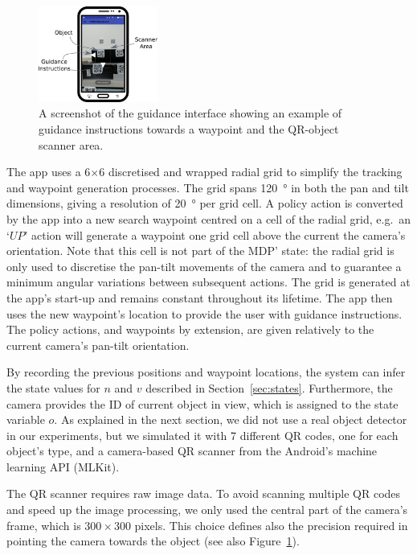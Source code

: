 \documentclass[a4paper, twoside]{article}
\begin{document}
\begin{figure}
  \centering
  \includegraphics[width=0.35\textwidth]{figures/system_screenshot2.png}
  \caption{A screenshot of the guidance interface showing an example of guidance instructions towards a waypoint and the QR-object scanner area.}\label{fig:system-screenshot}
\end{figure}

The app uses a 6$\times$6 discretised and wrapped radial grid to simplify the tracking and waypoint generation processes. The grid spans \SI{120}{\degree} in both the pan and tilt dimensions, giving a resolution of \SI{20}{\degree} per grid cell. A policy action is converted by the app into a new search waypoint centred on a cell of the radial grid, e.g.\ an `$UP$' action will generate a waypoint one grid cell above the current the camera's orientation. Note that this cell is not part of the MDP' state: the radial grid is only used to discretise the pan-tilt movements of the camera and to guarantee a minimum angular variations between subsequent actions. The grid is generated at the app's start-up and remains constant throughout its lifetime. The app then uses the new waypoint's location to provide the user with guidance instructions. The policy actions, and waypoints by extension, are given relatively to the current camera's pan-tilt orientation.  

By recording the previous positions and waypoint locations, the system can infer the state values for $n$ and $v$ described in Section~\ref{sec:states}. Furthermore, the camera provides the ID of current object in view, which is assigned to the state variable $o$. As explained in the next section, we did not use a real object detector in our experiments, but we simulated it with 7 different QR codes, one for each object's type, and a camera-based QR scanner from the Android's machine learning API (MLKit). 

The QR scanner requires raw image data. To avoid scanning multiple QR codes and speed up the image processing, we only used the central part of the camera's frame, which is $300\times300$ pixels. This choice defines also the precision required in pointing the camera towards the object (see also Figure~\ref{fig:system-screenshot}).
\end{document}
